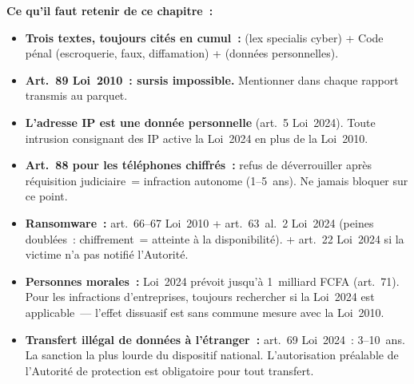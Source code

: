 \separateur

\begin{boxresume}
\textbf{Ce qu'il faut retenir de ce chapitre~:}
\begin{itemize}
    \item \textbf{Trois textes, toujours cités en cumul~:}
           (lex specialis cyber) + Code pénal
          (escroquerie, faux, diffamation) + 
          (données personnelles).

    \item \textbf{Art.~89 Loi~2010~: sursis impossible.} Mentionner
          dans chaque rapport transmis au parquet.

    \item \textbf{L'adresse IP est une donnée personnelle} (art.~5
          Loi~2024). Toute intrusion consignant des IP active la Loi~2024
          en plus de la Loi~2010.

    \item \textbf{Art.~88 pour les téléphones chiffrés~:} refus de
          déverrouiller après réquisition judiciaire~= infraction
          autonome (1--5~ans). Ne jamais bloquer sur ce point.

    \item \textbf{Ransomware~:} art.~66--67 Loi~2010 + art.~63~al.~2
          Loi~2024 (peines doublées~: chiffrement~= atteinte
          à la disponibilité). + art.~22 Loi~2024 si la victime
          n'a pas notifié l'Autorité.

    \item \textbf{Personnes morales~:} Loi~2024 prévoit jusqu'à
          1~milliard FCFA (art.~71). Pour les infractions d'entreprises,
          toujours rechercher si la Loi~2024 est applicable~---
          l'effet dissuasif est sans commune mesure avec la Loi~2010.

    \item \textbf{Transfert illégal de données à l'étranger~:}
          art.~69 Loi~2024~: 3--10~ans. La sanction la plus lourde
          du dispositif national. L'autorisation préalable de l'Autorité
          de protection est obligatoire pour tout transfert.
\end{itemize}
\end{boxresume}

\bigskip

